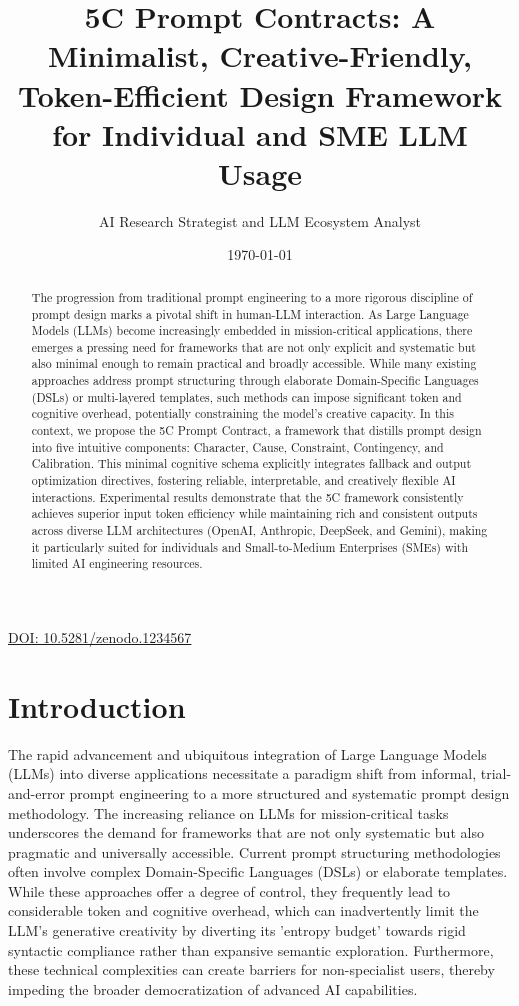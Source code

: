 \documentclass[10pt, a4paper]{article}
\title{5C Prompt Contracts: A Minimalist, Creative-Friendly, Token-Efficient Design Framework for Individual and SME LLM Usage}
\author{AI Research Strategist and LLM Ecosystem Analyst}
\date{\today}
\begin{document}
\maketitle

\href{https://doi.org/10.5281/zenodo.1234567}{DOI: 10.5281/zenodo.1234567}

\begin{abstract}
The progression from traditional prompt engineering to a more rigorous discipline of prompt design marks a pivotal shift in human-LLM interaction. As Large Language Models (LLMs) become increasingly embedded in mission-critical applications, there emerges a pressing need for frameworks that are not only explicit and systematic but also minimal enough to remain practical and broadly accessible. While many existing approaches address prompt structuring through elaborate Domain-Specific Languages (DSLs) or multi-layered templates, such methods can impose significant token and cognitive overhead, potentially constraining the model's creative capacity.
In this context, we propose the 5C Prompt Contract, a framework that distills prompt design into five intuitive components: Character, Cause, Constraint, Contingency, and Calibration. This minimal cognitive schema explicitly integrates fallback and output optimization directives, fostering reliable, interpretable, and creatively flexible AI interactions. Experimental results demonstrate that the 5C framework consistently achieves superior input token efficiency while maintaining rich and consistent outputs across diverse LLM architectures (OpenAI, Anthropic, DeepSeek, and Gemini), making it particularly suited for individuals and Small-to-Medium Enterprises (SMEs) with limited AI engineering resources.
\end{abstract}

\section{Introduction}
The rapid advancement and ubiquitous integration of Large Language Models (LLMs) into diverse applications necessitate a paradigm shift from informal, trial-and-error prompt engineering to a more structured and systematic prompt design methodology. The increasing reliance on LLMs for mission-critical tasks underscores the demand for frameworks that are not only systematic but also pragmatic and universally accessible. Current prompt structuring methodologies often involve complex Domain-Specific Languages (DSLs) or elaborate templates. While these approaches offer a degree of control, they frequently lead to considerable token and cognitive overhead, which can inadvertently limit the LLM's generative creativity by diverting its 'entropy budget' towards rigid syntactic compliance rather than expansive semantic exploration. Furthermore, these technical complexities can create barriers for non-specialist users, thereby impeding the broader democratization of advanced AI capabilities.
\end{document}
